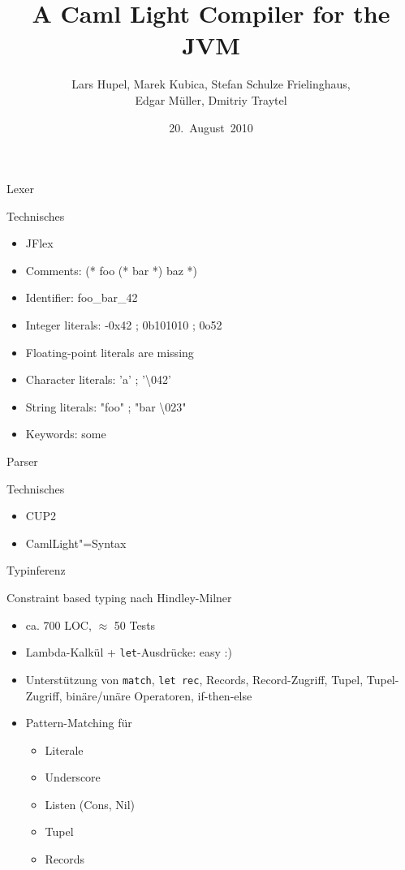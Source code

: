 \documentclass[hyperref={pdfpagelabels=false}]{beamer}
\title{A Caml Light Compiler for the JVM}
\author[Hupel, Kubica, Schulze Frielinghaus, Müller, Traytel]{Lars Hupel, Marek Kubica, Stefan Schulze Frielinghaus, \\Edgar Müller, Dmitriy Traytel}
\institute{TU~München}
\date{20.~August~2010}
\begin{document}
\frame{\titlepage}


\begin{frame}{Lexer}
  \begin{block}{Technisches}
    \begin{itemize}
      \item JFlex
      \item Comments: (* foo (* bar *) baz *)
      \item Identifier: foo\_bar\_42
      \item Integer literals: -0x42 ; 0b101010 ; 0o52
      \item Floating-point literals are missing
      \item Character literals: 'a' ; '\textbackslash 042'
      \item String literals: "foo" ; "bar \textbackslash 023"
      \item Keywords: some
    \end{itemize}
  \end{block}
\end{frame}

\begin{frame}{Parser}
  \begin{block}{Technisches}
    \begin{itemize}
      \item CUP2
      \item CamlLight"=Syntax
    \end{itemize}
  \end{block}
\end{frame}

\begin{frame}{Typinferenz}
  \begin{block}{Constraint based typing nach Hindley-Milner}
    \begin{itemize}
      \item ca. 700 LOC, $\approx$ 50 Tests
      \item Lambda-Kalk\"ul + \texttt{let}-Ausdr\"ucke: easy :)
      \item Unterst\"utzung von \texttt{match}, \texttt{let rec}, Records, Record-Zugriff, Tupel, Tupel-Zugriff, bin\"are/un\"are Operatoren, if-then-else
      \item Pattern-Matching f\"ur 
        \begin{itemize}
	  \item Literale
	  \item Underscore
	  \item Listen (Cons, Nil)
	  \item Tupel
	  \item Records
        \end{itemize}
    \end{itemize}
  \end{block}
\end{frame}
\end{document}
